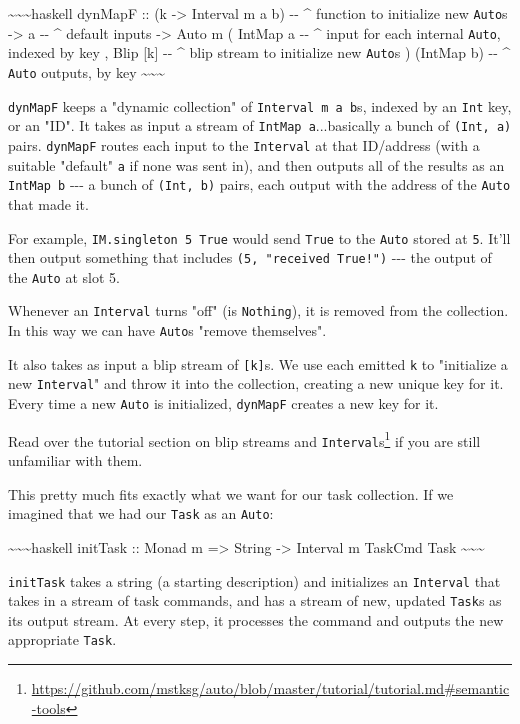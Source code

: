 \documentclass[]{article}
\renewcommand{\href}[2]{#2\footnote{\url{#1}}}
\begin{document}
\textasciitilde{}\textasciitilde{}\textasciitilde{}haskell dynMapF :: (k
-\textgreater{} Interval m a b) -\/- \^{} function to initialize new
\texttt{Auto}s -\textgreater{} a -\/- \^{} default inputs -\textgreater{} Auto m
( IntMap a -\/- \^{} input for each internal \texttt{Auto}, indexed by key ,
Blip {[}k{]} -\/- \^{} blip stream to initialize new \texttt{Auto}s ) (IntMap b)
-\/- \^{} \texttt{Auto} outputs, by key
\textasciitilde{}\textasciitilde{}\textasciitilde{}

\texttt{dynMapF} keeps a "dynamic collection" of \texttt{Interval\ m\ a\ b}s,
indexed by an \texttt{Int} key, or an "ID". It takes as input a stream of
\texttt{IntMap\ a}...basically a bunch of \texttt{(Int,\ a)} pairs.
\texttt{dynMapF} routes each input to the \texttt{Interval} at that ID/address
(with a suitable "default" \texttt{a} if none was sent in), and then outputs all
of the results as an \texttt{IntMap\ b} -\/-\/- a bunch of \texttt{(Int,\ b)}
pairs, each output with the address of the \texttt{Auto} that made it.

For example, \texttt{IM.singleton\ 5\ True} would send \texttt{True} to the
\texttt{Auto} stored at \texttt{5}. It'll then output something that includes
\texttt{(5,\ "received\ True!")} -\/-\/- the output of the \texttt{Auto} at slot
5.

Whenever an \texttt{Interval} turns "off" (is \texttt{Nothing}), it is removed
from the collection. In this way we can have \texttt{Auto}s "remove themselves".

It also takes as input a blip stream of \texttt{{[}k{]}}s. We use each emitted
\texttt{k} to "initialize a new \texttt{Interval}" and throw it into the
collection, creating a new unique key for it. Every time a new \texttt{Auto} is
initialized, \texttt{dynMapF} creates a new key for it.

Read over the
\href{https://github.com/mstksg/auto/blob/master/tutorial/tutorial.md\#semantic-tools}{tutorial
section on blip streams and \texttt{Interval}s} if you are still unfamiliar with
them.

This pretty much fits exactly what we want for our task collection. If we
imagined that we had our \texttt{Task} as an \texttt{Auto}:

\textasciitilde{}\textasciitilde{}\textasciitilde{}haskell initTask :: Monad m
=\textgreater{} String -\textgreater{} Interval m TaskCmd Task
\textasciitilde{}\textasciitilde{}\textasciitilde{}

\texttt{initTask} takes a string (a starting description) and initializes an
\texttt{Interval} that takes in a stream of task commands, and has a stream of
new, updated \texttt{Task}s as its output stream. At every step, it processes
the command and outputs the new appropriate \texttt{Task}.
\end{document}

